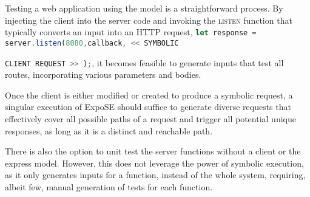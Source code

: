 Testing a web application using the model is a straightforward process.
By injecting the client into the server code and invoking the \textsc{listen}
function  that typically converts an input into an HTTP request, \lstinline[language=JavaScript]{let response = server.listen(8080,callback, << SYMBOLIC } \par\noindent\lstinline[language=JavaScript]{CLIENT REQUEST >> );}, it becomes feasible to generate inputs that test all routes, incorporating various parameters and bodies.


Once the client is either modified or created to produce a symbolic request, 
a singular execution of ExpoSE should suffice to generate diverse requests that effectively cover all possible paths of a request and trigger all potential unique responses, as long as it is a distinct and reachable path.  

There is also the option to unit test the server functions without a client or the express model. However, this does not leverage the power of symbolic execution, as it only generates inputs for a function, instead of the whole system, requiring, albeit few, manual generation of tests for each function.

